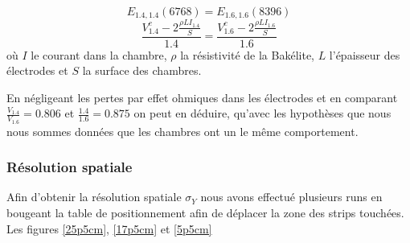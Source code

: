 \begin{equation}
E_{\num{1.4},\num{1.4}}\left( 6768 \right)=E_{\num{1.6},\num{1.6}}\left( 8396 \right)
\end{equation} 
\begin{equation}
\frac{V^c_{1.4}-2\frac{\rho L I_{1.4}}{S} }{1.4}=\frac{V^c_{1.6}-2\frac{\rho L I_{1.6}}{S} }{1.6}
\end{equation} 
où $I$ le courant dans la chambre, $\rho$ la résistivité de la Bakélite, $L$ l'épaisseur des électrodes et $S$ la surface des chambres.

En négligeant les pertes par effet ohmiques dans les électrodes et en comparant $\frac{V_{1.4}}{V_{1.6}}=\num{0.806}$ et $\frac{1.4}{1.6}=\num{0.875}$ on peut en déduire, qu'avec les hypothèses que nous nous sommes données que les chambres ont un le même comportement.

\subsubsection{Résolution spatiale}

Afin d'obtenir la résolution spatiale $\sigma_{Y}$ nous avons effectué plusieurs runs en bougeant la table de positionnement afin de déplacer la zone des strips touchées. Les figures \ref{25p5cm}, \ref{17p5cm} et \ref{5p5cm}

